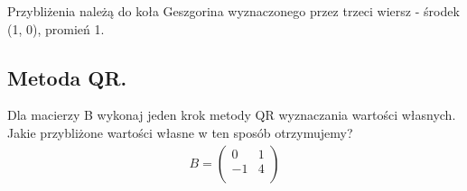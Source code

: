 \documentclass[main.tex]{subfiles}
\begin{document}
    Przybliżenia należą do koła Geszgorina wyznaczonego przez trzeci wiersz - środek (1, 0), promień 1.

    \subsection{Metoda QR.}

    \begin{exercise}
        Dla macierzy B wykonaj jeden krok metody QR wyznaczania wartości własnych. Jakie przybliżone wartości własne w
        ten sposób otrzymujemy?
        \begin{align*}
            B =
            \begin{pmatrix}
                0  & 1\\
                -1 & 4\\
            \end{pmatrix}
        \end{align*}
    \end{exercise}
\end{document}
